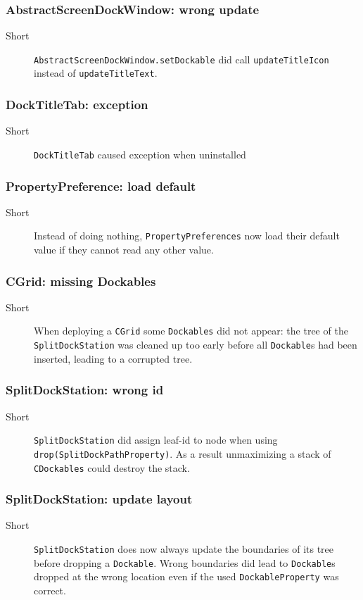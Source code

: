 \documentclass[a4paper,10pt]{article}
\newcommand{\src}[1]{\lstinline[basicstyle=\normalsize\ttfamily,keywordstyle=\normalsize\ttfamily,identifierstyle=\normalsize\ttfamily]|#1|}
\newcommand{\short}{\item[Short]}
\begin{document}
\subsubsection{AbstractScreenDockWindow: wrong update}
\begin{description}
 \short \src{AbstractScreenDockWindow.setDockable} did call \src{updateTitleIcon} instead of \src{updateTitleText}.
\end{description}

\subsubsection{DockTitleTab: exception}
\begin{description}
 \short \src{DockTitleTab} caused exception when uninstalled
\end{description}


\subsubsection{PropertyPreference: load default}
\begin{description}
 \short Instead of doing nothing, \src{PropertyPreferences} now load their default value if they cannot read any other value.
\end{description}

\subsubsection{CGrid: missing Dockables}
\begin{description}
 \short When deploying a \src{CGrid} some \src{Dockables} did not appear: the tree of the \src{SplitDockStation} was cleaned up too early before all \src{Dockable}s had been inserted, leading to a corrupted tree.
\end{description}

\subsubsection{SplitDockStation: wrong id}
\begin{description}
 \short \src{SplitDockStation} did assign leaf-id to node when using \src{drop(SplitDockPathProperty)}. As a result unmaximizing a stack of \src{CDockables} could destroy the stack.
\end{description}

\subsubsection{SplitDockStation: update layout}
\begin{description}
 \short \src{SplitDockStation} does now always update the boundaries of its tree before dropping a \src{Dockable}. Wrong boundaries did lead to \src{Dockable}s dropped at the wrong location even if the used \src{DockableProperty} was correct.
\end{description}
\end{document}
